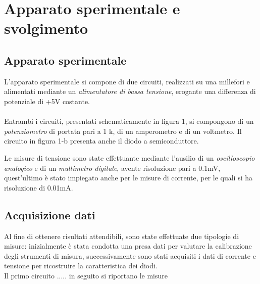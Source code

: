 \documentclass[@MAIN@]{subfiles}
\begin{document}
    \section{Apparato sperimentale e svolgimento} \label{sec:acquisizione}

    \subsection{Apparato sperimentale}\label{subsec:apparato-sperimentale}
    L'apparato sperimentale si compone di due circuiti, realizzati su una millefori
    e alimentati mediante un \textit{alimentatore di bassa tensione},
    erogante una differenza di potenziale di +5V costante.
    \\ \\
    
    \newpage
    Entrambi i circuiti, presentati schematicamente in figura 1, si compongono di
    un \textit{potenziometro} di portata pari a 1 k\textohm, di un amperometro e
    di un voltmetro.
    Il circuito in figura 1-b presenta anche il diodo a semiconduttore.

    Le misure di tensione sono state effettuante mediante l'ausilio di un
    \textit{oscilloscopio analogico} e di un \textit{multimetro digitale}, avente
    risoluzione pari a 0.1mV, quest'ultimo è stato impiegato anche per le misure
    di corrente, per le quali si ha risoluzione di 0.01mA.

    \subsection{Acquisizione dati}\label{subsec:acquisizione-dati}

    Al fine di ottenere risultati attendibili, sono state effettuate due tipologie
    di misure: inizialmente è stata condotta una presa dati per valutare la
    calibrazione degli strumenti di misura, successivamente sono stati acquisiti
    i dati di corrente e tensione per ricostruire la caratteristica dei diodi. \\

    Il primo circuito .....
    in seguito si riportano le misure
    \\ \\
    \begin{center}
        
    \end{center}


    \begin{minipage}{.45\textwidth}
        \centering
        
    \end{minipage}
    \hfill
    \begin{minipage}{.45\textwidth}
        \centering
        
    \end{minipage}
\end{document}
